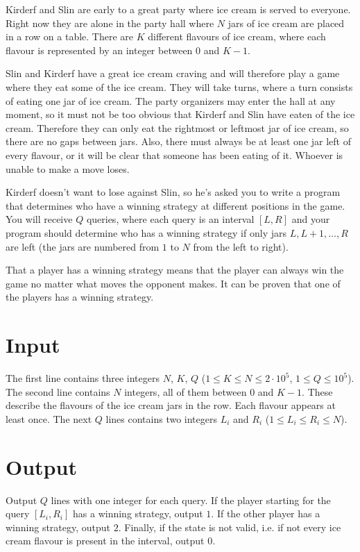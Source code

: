 Kirderf and Slin are early to a great party where ice cream is served to everyone.
Right now they are alone in the party hall where $N$ jars of ice cream are placed in a row on a table.
There are $K$ different flavours of ice cream, where each flavour is represented by an integer between $0$ and $K - 1$.

Slin and Kirderf have a great ice cream craving and will therefore play a game where they eat some of the ice cream.
They will take turns, where a turn consists of eating one jar of ice cream.
The party organizers may enter the hall at any moment, so it must not be too obvious that Kirderf and Slin have eaten of the ice cream.
Therefore they can only eat the rightmost or leftmost jar of ice cream, so there are no gaps between jars.
Also, there must always be at least one jar left of every flavour, or it will be clear that someone has been eating of it.
Whoever is unable to make a move loses.

Kirderf doesn't want to lose against Slin, so he's asked you to write a program that determines who have a winning strategy at different positions in the game.
You will receive $Q$ queries, where each query is an interval $[L, R]$ and your program should determine who has a winning strategy if only jars $L, L + 1, \dots, R$ are left (the jars are numbered from $1$ to $N$ from the left to right).

That a player has a winning strategy means that the player can always win the game no matter what moves the opponent makes.
It can be proven that one of the players has a winning strategy.

\section*{Input}
The first line contains three integers $N$, $K$, $Q$ ($1 \le K \le N \le 2 \cdot 10^5$, $1 \le Q \le 10^5$).
The second line contains $N$ integers, all of them between $0$ and $K - 1$.
These describe the flavours of the ice cream jars in the row.
Each flavour appears at least once.
The next $Q$ lines contains two integers $L_i$ and $R_i$ ($1 \le L_i \le R_i \le N$).

\section*{Output}
Output $Q$ lines with one integer for each query.
If the player starting for the query $[L_i, R_i]$ has a winning strategy, output $1$.
If the other player has a winning strategy, output $2$.
Finally, if the state is not valid, i.e. if not every ice cream flavour is present in the interval, output $0$.

